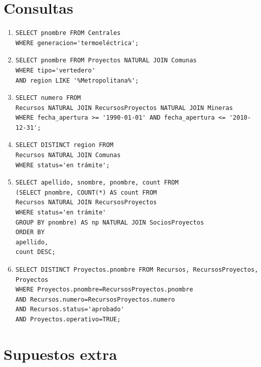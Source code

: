\documentclass{article}
\begin{document}
\section{Consultas}

\begin{enumerate}
	\item \begin{verbatim}
SELECT pnombre FROM Centrales
WHERE generacion='termoeléctrica';
\end{verbatim}

\item \begin{verbatim}
SELECT pnombre FROM Proyectos NATURAL JOIN Comunas 
WHERE tipo='vertedero'
AND region LIKE '%Metropolitana%';
\end{verbatim}

\item \begin{verbatim}
SELECT numero FROM 
Recursos NATURAL JOIN RecursosProyectos NATURAL JOIN Mineras
WHERE fecha_apertura >= '1990-01-01' AND fecha_apertura <= '2010-12-31';
\end{verbatim}

\item \begin{verbatim}
SELECT DISTINCT region FROM
Recursos NATURAL JOIN Comunas
WHERE status='en trámite';
\end{verbatim}

\item \begin{verbatim}
SELECT apellido, snombre, pnombre, count FROM
(SELECT pnombre, COUNT(*) AS count FROM
Recursos NATURAL JOIN RecursosProyectos
WHERE status='en trámite'
GROUP BY pnombre) AS np NATURAL JOIN SociosProyectos 
ORDER BY 
apellido,
count DESC;
\end{verbatim}

\item \begin{verbatim}
SELECT DISTINCT Proyectos.pnombre FROM Recursos, RecursosProyectos, Proyectos 
WHERE Proyectos.pnombre=RecursosProyectos.pnombre 
AND Recursos.numero=RecursosProyectos.numero
AND Recursos.status='aprobado'
AND Proyectos.operativo=TRUE;
\end{verbatim}

\end{enumerate}

\section{Supuestos extra}
\end{document}
